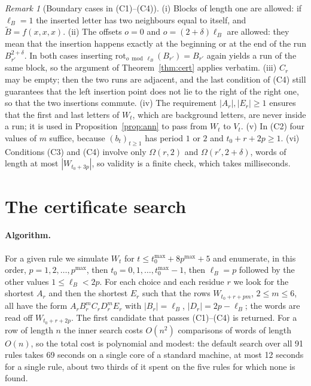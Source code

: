 \documentclass[11pt]{article}
\theoremstyle{definition}
\theoremstyle{remark}
\newtheorem{remark}[theorem]{Remark}
\begin{document}
\begin{remark}[Boundary cases in (C1)--(C4)]\label{rem:edge}
(i) Blocks of length one are allowed: if $\ell_B=1$ the inserted letter has two neighbours equal to itself, and $\widetilde B=f(x,x,x)$. (ii) The offsets $o=0$ and $o=(2+\delta)\ell_B$ are allowed: they mean that the insertion happens exactly at the beginning or at the end of the run $B_{r'}^{2+\delta}$. In both cases inserting $\mathrm{rot}_{o\bmod\ell_B}(B_{r'})=B_{r'}$ again yields a run of the same block, so the argument of Theorem~\ref{thm:cert} applies verbatim. (iii) $C_r$ may be empty; then the two runs are adjacent, and the last condition of (C4) still guarantees that the left insertion point does not lie to the right of the right one, so that the two insertions commute. (iv) The requirement $|A_r|,|E_r|\ge1$ ensures that the first and last letters of $W_t$, which are background letters, are never inside a run; it is used in Proposition~\ref{prop:ann} to pass from $W_t$ to $V_t$. (v) In (C2) four values of $m$ suffice, because $(b_t)_{t\ge1}$ has period $1$ or $2$ and $t_0+r+2p\ge1$. (vi) Conditions (C3) and (C4) involve only $\Omega(r,2)$ and $\Omega(r',2+\delta)$, words of length at most $|W_{t_0+3p}|$, so validity is a finite check, which takes milliseconds.
\end{remark}

\section{The certificate search}\label{sec:search}

\paragraph{Algorithm.} For a given rule we simulate $W_t$ for $t\le t_0^{\max}+8p^{\max}+5$ and enumerate, in this order, $p=1,2,\dots,p^{\max}$, then $t_0=0,1,\dots,t_0^{\max}-1$, then $\ell_B=p$ followed by the other values $1\le\ell_B<2p$. For each choice and each residue $r$ we look for the shortest $A_r$ and then the shortest $E_r$ such that the rows $W_{t_0+r+pm}$, $2\le m\le 6$, all have the form $A_rB_r^mC_rD_r^mE_r$ with $|B_r|=\ell_B$, $|D_r|=2p-\ell_B$; the words are read off $W_{t_0+r+2p}$. The first candidate that passes (C1)--(C4) is returned. For a row of length $n$ the inner search costs $O(n^2)$ comparisons of words of length $O(n)$, so the total cost is polynomial and modest: the default search over all 91 rules takes 69 seconds on a single core of a standard machine, at most 12 seconds for a single rule, about two thirds of it spent on the five rules for which none is found.
\end{document}
